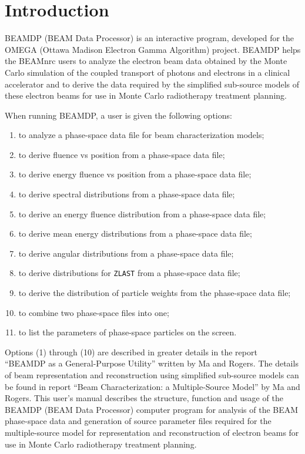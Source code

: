 \documentclass[12pt,twoside]{article}
\begin{document}
\newpage
\mbox{}	%
\newpage
\setcounter{page}{1}
\pagestyle{fancy}

\tableofcontents

\newpage


\section{Introduction}
BEAMDP (BEAM Data Processor) is an interactive program, developed for the OMEGA
(Ottawa Madison Electron Gamma Algorithm) project. BEAMDP helps the
BEAMnrc\cite{Ro95,Ro04a} users to analyze the electron beam data obtained by the
Monte Carlo simulation of the coupled transport of photons and electrons in a
clinical accelerator and to derive the data required by the simplified
sub-source models of these electron beams for use in Monte Carlo radiotherapy
treatment planning\cite{MR04b,Ma95c}.

\vspace{0.2cm}
When running BEAMDP, a user is given the following options:


\begin{enumerate}
\item to analyze a phase-space data file for beam characterization models;
\item to derive fluence vs position from a phase-space data file;
\item to derive energy fluence vs position from a phase-space data file;
\item to derive spectral distributions from a phase-space data file;
\item to derive an energy fluence distribution from a phase-space data file;
\item to derive mean energy distributions from a phase-space data file;
\item to derive angular distributions from a phase-space data file;
\item to derive distributions for {\tt ZLAST} from a phase-space data file;
\item to derive the distribution of particle weights from the phase-space data
file;
\item to combine two phase-space files into one;
\item to list the parameters of phase-space particles on the screen.
\end{enumerate}

\noindent
Options (1) through (10) are described in greater details in the report ``BEAMDP as a General-Purpose Utility'' written by Ma and Rogers\cite{MR04b}. The details of beam representation and reconstruction using simplified sub-source models can be found in report ``Beam Characterization: a Multiple-Source Model'' by Ma and Rogers\cite{Ma95c}. This user's manual describes the structure, function and usage of the BEAMDP (BEAM Data Processor) computer program for analysis of  the BEAM phase-space data and generation of source parameter files required for the multiple-source model for representation and reconstruction of electron beams for use in Monte Carlo radiotherapy treatment planning.
\end{document}
